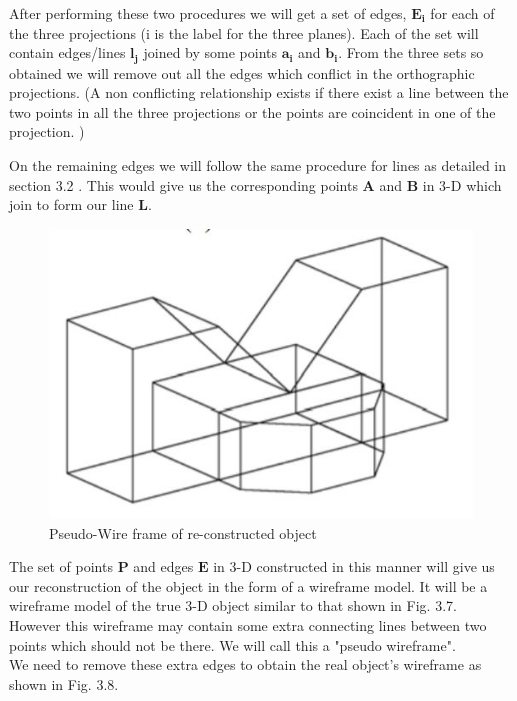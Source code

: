 \documentclass[a4paper,11pt,openany]{book}
\begin{document}
After performing these two procedures we will get a set of edges, $\boldsymbol{E_i}$ for each of the three projections (i is the label for the three planes). Each of the set will contain edges/lines $\boldsymbol{l_j}$ joined by some points $\boldsymbol{a_i}$ and $\boldsymbol{b_i}$. From the three sets so obtained we will remove out all the edges which conflict in the orthographic projections. (A non conflicting relationship exists if there exist a line between the two points in all the three projections or the points are coincident in one of the projection. )

On the remaining edges we will follow the same procedure for lines as detailed in section 3.2 . This would give us the corresponding points $\boldsymbol{A}$ and $\boldsymbol{B}$ in 3-D which join to form our line $\boldsymbol{L}$.


\begin{figure}[ht]
\centering
\includegraphics[scale=0.5]{PseudoWireFrame}
\caption{Pseudo-Wire frame of re-constructed object}
\end{figure}

The set of points $\boldsymbol{P}$ and edges $\boldsymbol{E}$ in 3-D constructed in this manner will give us our reconstruction of the object in the form of a wireframe model. It will be a wireframe model of the true 3-D object similar to that shown in Fig. 3.7. However this wireframe may contain some extra connecting lines between two points which should not be there. We will call this a "pseudo wireframe".\\

We need to remove these extra edges to obtain the real object's wireframe as shown in Fig. 3.8. 
\end{document}
